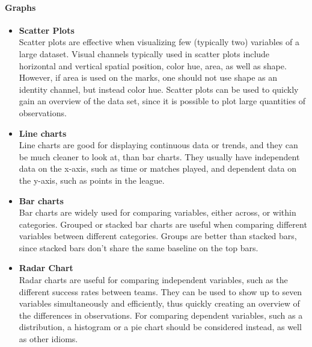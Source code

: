 \documentclass[Report.tex]{subfiles}
\begin{document}
\paragraph{Graphs\\}
\begin{itemize}
  \item \textbf{Scatter Plots}
  \\Scatter plots are effective when visualizing few (typically two) variables
  of a large dataset\cite[Chapter 5, p. 54]{Iliinsky}. Visual channels typically used in
  scatter plots include horizontal and vertical spatial position, color hue, area, as well as shape. However,
  if area is used on the marks, one should not use shape as an identity channel,
  but instead color hue. 
  Scatter plots can be used to quickly gain an overview of the data set, since
  it is possible to plot large quantities of observations.
  
  \item \textbf{Line charts}
  \\Line charts are good for displaying continuous data or trends, and they can
  be much cleaner to look at, than bar charts. They usually have independent
  data on the x-axis, such as time or matches played, and dependent data on the
  y-axis, such as points in the league.
  
  \item \textbf{Bar charts}
  \\Bar charts are widely used for comparing variables, either across, or within
  categories. Grouped or stacked bar charts are useful when comparing different variables between different categories.
 Groups are better than stacked bars, since stacked
  bars don't share the same baseline on the top bars.
  
  \item \textbf{Radar Chart}
  \\Radar charts are useful for comparing independent variables, such as the
  different success rates between teams. They can be used to show up to seven
  variables simultaneously and efficiently, thus quickly creating an overview of the
  differences in observations. For comparing dependent variables, such as a
  distribution, a histogram or a pie chart should be considered instead, as well
  as other idioms.

\end{itemize}
\end{document}
